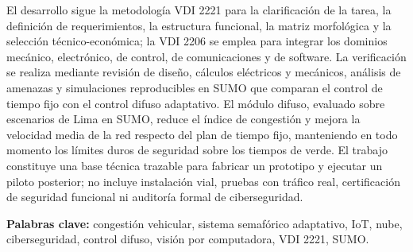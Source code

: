 \documentclass[12pt,a4paper,oneside]{report}
\numberwithin{figure}{chapter}
\numberwithin{table}{chapter}
\numberwithin{equation}{chapter}
\renewcommand{\contentsname}{ÍNDICE DE CONTENIDO}%
\DeclareRobustCommand{\%}{\ifmmode\text{\char37\relax}\else\char37\relax\fi}%
\begin{document}
El desarrollo sigue la metodología VDI 2221 para la clarificación de la tarea, la definición de
requerimientos, la estructura funcional, la matriz morfológica y la selección técnico-económica; la VDI
2206 se emplea para integrar los dominios mecánico, electrónico, de control, de comunicaciones y de
software. La verificación se realiza mediante revisión de diseño, cálculos eléctricos y mecánicos, análisis
de amenazas y simulaciones reproducibles en SUMO que comparan el control de tiempo fijo con el control
difuso adaptativo. El módulo difuso, evaluado sobre escenarios de Lima en SUMO, reduce el índice de
congestión y mejora la velocidad media de la red respecto del plan de tiempo fijo, manteniendo en todo
momento los límites duros de seguridad sobre los tiempos de verde. El trabajo constituye una base técnica
trazable para fabricar un prototipo y ejecutar un piloto posterior; no incluye instalación vial, pruebas
con tráfico real, certificación de seguridad funcional ni auditoría formal de ciberseguridad.

\vspace{0.4cm}
\noindent\textbf{Palabras clave:} congestión vehicular, sistema semafórico adaptativo, IoT, nube, ciberseguridad, control difuso, visión por computadora, VDI 2221, SUMO.
\endgroup

\cleardoublepage
{}
\renewcommand{\contentsname}{ÍNDICE DE CONTENIDO}
\tableofcontents

\cleardoublepage
{}
{}
\listoftables

\cleardoublepage
{}
{}
\listoffigures

\cleardoublepage
{}











\end{document}
